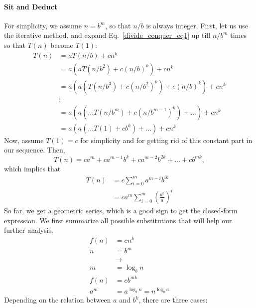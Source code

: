 \documentclass[../main.tex]{subfiles}
\begin{document}
\paragraph{Sit and Deduct} For simplicity, we assume $n=b^m$, so that $n/b$ is always integer. First, let us use the iterative method, and expand Eq.~\ref{divide_conquer_eq1} up till $n/b^m$ times so that $T(n)$ become $T(1)$:
\begin{align}
    T(n)&=aT(n/b)+cn^k\\
    &=a(aT(n/b^2)+c(n/b)^k)+cn^k\\
    &=a(a(T(n/b^3)+c(n/b^2)^k)+c(n/b)^k)+cn^k\\
    &\vdots\\
    &=a(a(\ldots T(n/b^m)+c(n/b^{m-1})^{k})+\ldots)+cn^k\\ 
    &=a(a(\ldots T(1)+cb^{k})+\ldots)+cn^k
\end{align}
Now, assume $T(1)=c$ for simplicity and for getting rid of this constant part in our sequence. Then,
\begin{equation}
    T(n)=ca^m+ca^{m-1}b^k+ca^{m-2}b^{2k}+\ldots+cb^{mk},
\end{equation}
which implies that
\begin{align}
T(n)&=c\sum_{i=0}^ma^{m-i}b^{ik}\\
&=ca^m\sum_{i=0}^m(\frac{b^k}{a})^i
\end{align}
So far, we get a geometric series, which is a good sign to get the closed-form expression. We first summarize all possible substitutions that will help our further analysis.
\begin{align}
    f(n)&=cn^k\\
    n&=b^m\\
    & \xrightarrow{} \\
    \label{eq_divide_conquer_sub_2}
    m&=\log_b n\\
    f(n)&=cb^{mk}\\
    a^m&=a^{\log_b n}=n^{\log_b a}\label{eq_divide_conquer_sub_1}
\end{align}
Depending on the relation between $a$ and $b^k$, there are three cases:
\end{document}
